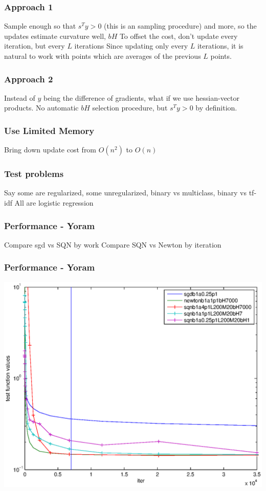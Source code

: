 \documentclass{beamer}
\begin{document}
\begin{frame}
	\frametitle{Approach 1}
	Sample enough so that $s^Ty > 0$ (this is an sampling procedure) and more, so the updates estimate curvature well, $bH$
	To offset the cost, don't update every iteration, but every $L$ iterations 
	Since updating only every $L$ iterations, it is natural to work with points which are averages of the previous $L$ points.
\end{frame}

\begin{frame}
	\frametitle{Approach 2}
	Instead of $y$ being the difference of gradients, what if we use hessian-vector products. No automatic $bH$ selection procedure, but $s^Ty>0$ by definition. 
\end{frame}

\begin{frame}
	\frametitle{Use Limited Memory}
	Bring down update cost from $O(n^2)$ to $O(n)$
\end{frame}

\begin{frame}
	\frametitle{Test problems}
	Say some are regularized, some unregularized, binary vs multiclass, binary vs tf-idf
	All are logistic regression
\end{frame}

\begin{frame}
	\frametitle{Performance - Yoram}
	Compare sgd vs SQN by work
	Compare SQN vs Newton by iteration
\end{frame}

\begin{frame}
	\frametitle{Performance - Yoram}
				\includegraphics[scale=0.4]{figures/P02.eps}
\end{frame}
\end{document}
